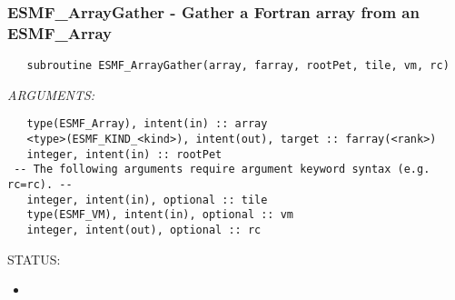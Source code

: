  
\setlength{\oldparskip}{\parskip}
\setlength{\parskip}{1.5ex}
\setlength{\oldparindent}{\parindent}
\setlength{\parindent}{0pt}
\setlength{\oldbaselineskip}{\baselineskip}
\setlength{\baselineskip}{11pt}
 
\def\bv{\begin{verbatim}}
\def\ev{\end{verbatim}}
\def\be{\begin{equation}}
\def\ee{\end{equation}}
\def\bea{\begin{eqnarray}}
\def\eea{\end{eqnarray}}
\def\bi{\begin{itemize}}
\def\ei{\end{itemize}}
\def\bn{\begin{enumerate}}
\def\en{\end{enumerate}}
\def\bd{\begin{description}}
\def\ed{\end{description}}
\def\({\left (}
\def\){\right )}
\def\[{\left [}
\def\]{\right ]}
\def\<{\left  \langle}
\def\>{\right \rangle}
\def\cI{{\cal I}}
\def\diag{\mathop{\rm diag}}
\def\tr{\mathop{\rm tr}}


 

   \subsubsection [ESMF\_ArrayGather] {ESMF\_ArrayGather - Gather a Fortran array from an ESMF\_Array }


   
\begin{verbatim}   subroutine ESMF_ArrayGather(array, farray, rootPet, tile, vm, rc) 
   \end{verbatim}{\em ARGUMENTS:}
\begin{verbatim}   type(ESMF_Array), intent(in) :: array 
   <type>(ESMF_KIND_<kind>), intent(out), target :: farray(<rank>) 
   integer, intent(in) :: rootPet 
 -- The following arguments require argument keyword syntax (e.g. rc=rc). --
   integer, intent(in), optional :: tile 
   type(ESMF_VM), intent(in), optional :: vm 
   integer, intent(out), optional :: rc 
   \end{verbatim}
{\sf STATUS:}
   \begin{itemize} 
   \item{} 
   \end{itemize} 
   

